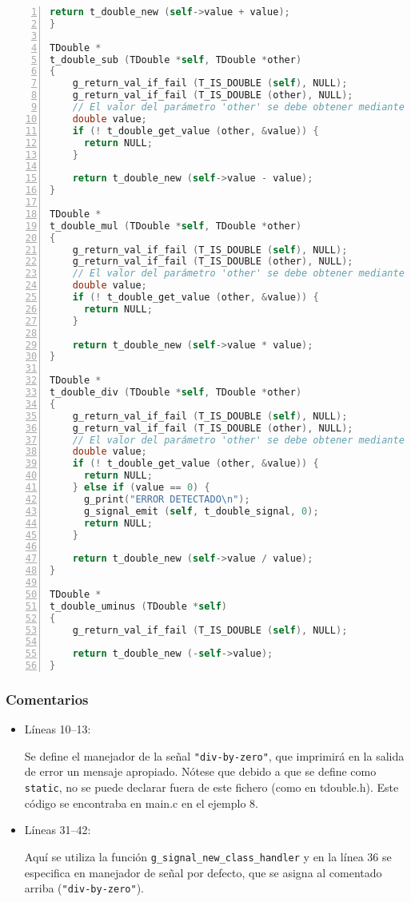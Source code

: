 \begin{lstlisting}[language=C, numbers=left]
    return t_double_new (self->value + value);
}

TDouble *
t_double_sub (TDouble *self, TDouble *other)
{
    g_return_val_if_fail (T_IS_DOUBLE (self), NULL);
    g_return_val_if_fail (T_IS_DOUBLE (other), NULL);
    // El valor del parámetro 'other' se debe obtener mediante el método 'getter'
    double value;
    if (! t_double_get_value (other, &value)) {
      return NULL;
    }

    return t_double_new (self->value - value);
}

TDouble *
t_double_mul (TDouble *self, TDouble *other)
{
    g_return_val_if_fail (T_IS_DOUBLE (self), NULL);
    g_return_val_if_fail (T_IS_DOUBLE (other), NULL);
    // El valor del parámetro 'other' se debe obtener mediante el método 'getter'
    double value;
    if (! t_double_get_value (other, &value)) {
      return NULL;
    }

    return t_double_new (self->value * value);
}

TDouble *
t_double_div (TDouble *self, TDouble *other)
{
    g_return_val_if_fail (T_IS_DOUBLE (self), NULL);
    g_return_val_if_fail (T_IS_DOUBLE (other), NULL);
    // El valor del parámetro 'other' se debe obtener mediante el método 'getter'
    double value;
    if (! t_double_get_value (other, &value)) {
      return NULL;
    } else if (value == 0) {
      g_print("ERROR DETECTADO\n");
      g_signal_emit (self, t_double_signal, 0);
      return NULL;
    }
    
    return t_double_new (self->value / value);
}

TDouble *
t_double_uminus (TDouble *self)
{
    g_return_val_if_fail (T_IS_DOUBLE (self), NULL);

    return t_double_new (-self->value);
}
\end{lstlisting}

\subsubsection{Comentarios}
\begin{itemize}
\item Líneas 10--13:\par
  Se define el manejador de la señal \texttt{"div-by-zero"}, que imprimirá en la salida
  de error un mensaje apropiado. Nótese que debido a que se define como \texttt{static},
  no se puede declarar fuera de este fichero (como en \textsf{tdouble.h}).
  Este código se encontraba en \textsf{main.c} en el ejemplo 8.
\item Líneas 31--42:\par
  Aquí se utiliza la función \texttt{g\_signal\_new\_class\_handler} y en la línea
  36 se especifica en manejador de señal por defecto, que se asigna al comentado
  arriba (\texttt{"div-by-zero"}).
\end{itemize}

